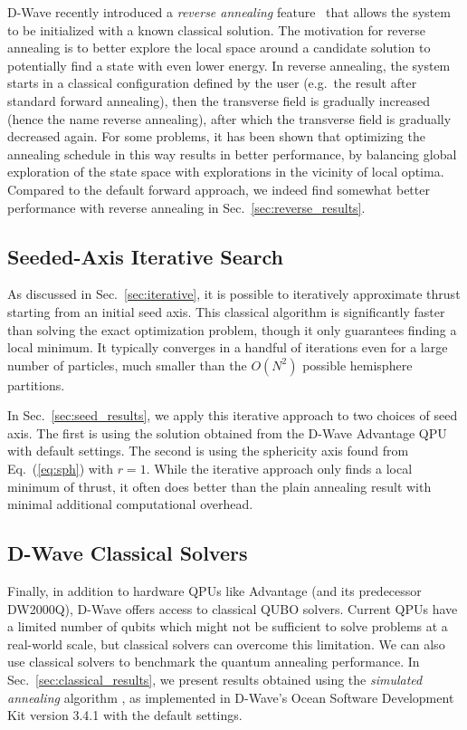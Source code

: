 \documentclass[aps,prd,twocolumn,superscriptaddress,preprintnumbers,nofootinbib,longbibliography,floatfix]{revtex4-1}
\DeclareRobustCommand{\Sec}[1]{Sec.~\ref{sec:#1}}
\DeclareRobustCommand{\Eq}[1]{Eq.~(\ref{eq:#1})}
\begin{document}
D-Wave recently introduced a \textit{reverse annealing} feature~\cite{Dwave-RA} that allows the system to be initialized with a known classical solution.
%
The motivation for reverse annealing is to better explore the local space around a candidate solution to potentially find a state with even lower energy.
%
In reverse annealing, the system starts in a classical configuration defined by the user (e.g.~the result after standard forward annealing), then the transverse field is gradually increased (hence the name reverse annealing), after which the transverse field is gradually decreased again.
%
For some problems, it has been shown that optimizing the annealing schedule in this way results in better performance, by balancing global exploration of the state space with explorations in the vicinity of local optima.
%
Compared to the default forward approach, we indeed find somewhat better performance with reverse annealing in \Sec{reverse_results}.



\subsection{Seeded-Axis Iterative Search}
\label{sec:seed}

As discussed in \Sec{iterative}, it is possible to iteratively approximate thrust starting from an initial seed axis.
%
This classical algorithm is significantly faster than solving the exact optimization problem, though it only guarantees finding a local minimum.
%
It typically converges in a handful of iterations even for a large number of particles, much smaller than the $O(N^2)$ possible hemisphere partitions.

In \Sec{seed_results}, we apply this iterative approach to two choices of seed axis.
%
The first is using the solution obtained from the D-Wave Advantage QPU with default settings.
%
The second is using the sphericity axis found from \Eq{sph} with $r=1$.
%
While the iterative approach only finds a local minimum of thrust, it often does better than the plain annealing result with minimal additional computational overhead.


\subsection{D-Wave Classical Solvers}

Finally, in addition to hardware QPUs like Advantage (and its predecessor DW2000Q), D-Wave offers access to classical QUBO solvers.
%
Current QPUs have a limited number of qubits which might not be sufficient to solve problems at a real-world scale, but classical solvers can overcome this limitation.
%
We can also use classical solvers to benchmark the quantum annealing performance.
%
In \Sec{classical_results}, we present results obtained using the \textit{simulated annealing} algorithm \cite{simann}, as implemented in D-Wave's Ocean Software Development Kit version 3.4.1 with the default settings.
%
\end{document}
